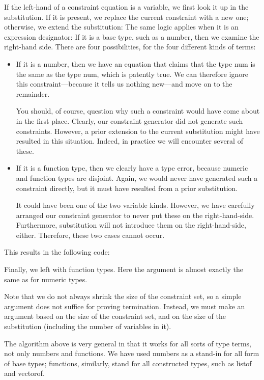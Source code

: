 If the left-hand of a constraint equation is a variable, we first look it up in the substitution.
If it is present, we replace the current constraint with a new one; otherwise,
we extend the substitution:
The same logic applies when it is an expression designator:
If it is a base type, such as a number, then we examine the right-hand side. There
are four possibilities, for the four different kinds of terms:
\begin{itemize}
  \item 
If it is a number, then we have an equation that claims that the type num is
the same as the type num, which is patently true. We can therefore ignore this
constraint—because it tells us nothing new—and move on to the remainder.

You should, of course, question why such a constraint would have come about in
the first place. Clearly, our constraint generator did not generate such constraints.
However, a prior extension to the current substitution might have resulted in this
situation. Indeed, in practice we will encounter several of these.

  \item 
If it is a function type, then we clearly have a type error, because numeric and
function types are disjoint. Again, we would never have generated such a constraint
directly, but it must have resulted from a prior substitution.

It could have been one of the two variable kinds. However, we have carefully
arranged our constraint generator to never put these on the right-hand-side. Furthermore,
substitution will not introduce them on the right-hand-side, either.
Therefore, these two cases cannot occur.
\end{itemize}
This results in the following code:

Finally, we left with function types. Here the argument is almost exactly the same
as for numeric types.

Note that we do not always shrink the size of the constraint set, so a simple argument
does not suffice for proving termination. Instead, we must make an argument
based on the size of the constraint set, and on the size of the substitution (including the
number of variables in it).

The algorithm above is very general in that it works for all sorts of type terms,
not only numbers and functions. We have used numbers as a stand-in for all form of
base types; functions, similarly, stand for all constructed types, such as listof and
vectorof.

